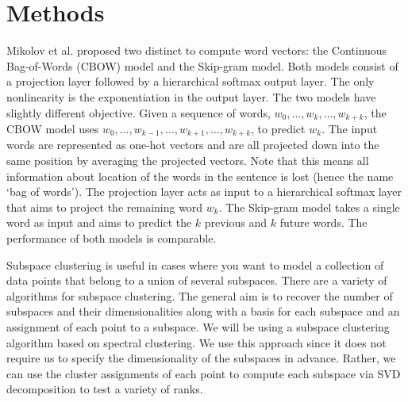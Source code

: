 \section{Methods}\label{sec:methods}

Mikolov et al. proposed two distinct to compute word vectors: the Continuous Bag-of-Words (CBOW) model and the Skip-gram model. 
Both models consist of a projection layer followed by a hierarchical softmax output layer. 
The only nonlinearity is the exponentiation in the output layer. 
The two models have slightly different objective. 
Given a sequence of words, $w_0, \hdots , w_k, \hdots, w_{k+k}$, the CBOW model uses $w_0, \hdots, w_{k-1}, \hdots, w_{k+1}, \hdots, w_{k+k}$, to predict $w_k$. 
The input words are represented as one-hot vectors and are all projected down into the same position by averaging the projected vectors. 
Note that this means all information about location of the words in the sentence is lost (hence the name `bag of words'). 
The projection layer acts as input to a hierarchical softmax layer that aims to project the remaining word $w_k$. 
The Skip-gram model takes a single word as input and aims to predict the $k$ previous and $k$ future words. 
The performance of both models is comparable.

Subspace clustering is useful in cases where you want to model a collection of data points that belong to a union of several subspaces.
There are a variety of algorithms for subspace clustering. The general aim is to recover the number of subspaces and their dimensionalities along with a basis for each subspace and an assignment of each point to a subspace. 
We will be using a subspace clustering algorithm based on spectral clustering. We use this approach since it does not require us to specify the dimensionality of the subspaces in advance. Rather, we can use the cluster assignments of each point to compute each subspace via SVD decomposition to test a variety of ranks. 
